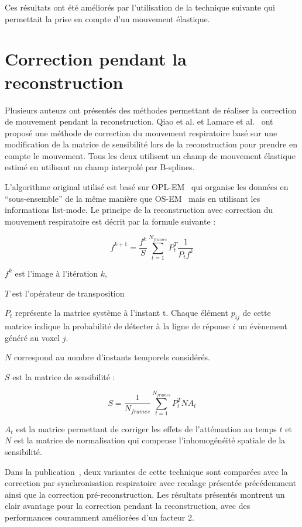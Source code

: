 Ces résultats ont été améliorés par l'utilisation de la technique suivante qui permettait la prise en compte d'un mouvement élastique.

\section{Correction pendant la reconstruction}


Plusieurs auteurs ont présentés des méthodes permettant de réaliser la correction de mouvement pendant la reconstruction. Qiao et al.\cite{qiao2006motion} et Lamare et al.~\cite{lamare2007list} ont proposé une méthode de correction du mouvement respiratoire basé sur une modification de la matrice de sensibilité lors de la reconstruction pour prendre en compte le mouvement. Tous les deux utilisent un champ de mouvement élastique estimé en utilisant un champ interpolé par B-splines.

L'algorithme original utilisé est basé sur OPL-EM~\cite{reader2002one} qui organise les données en ``sous-ensemble'' de la même manière que OS-EM~\cite{hudson1994accelerated} mais en utilisant les informations list-mode. Le principe de la reconstruction avec correction du mouvement respiratoire est décrit par la formule suivante :

\label{lab:corrMatSyst}
\begin{equation}
 f^{k+1}=\frac{f^k}{S} \sum_{t=1}^{N_{frames}} P_t^T \frac{1}{P_t f^k} 
\end{equation}

$f^k$ est l'image à l'itération $k$,

$T$ est l'opérateur de transposition

$P_t$ représente la matrice système à l'instant t. Chaque élément $p_{ij}$ de cette matrice indique la probabilité de détecter à la ligne de réponse $i$ un évènement généré au voxel $j$. 

$N$ correspond au nombre d'instants temporels considérés.

$S$ est la matrice de sensibilité :

\begin{equation}
 S=\frac{1}{N_{frames}} \sum_{t=1}^{N_{frames}} P_t^T N A_t 
\end{equation}

 $A_t$ est la matrice permettant de corriger les effets de l'atténuation au temps $t$ et $N$ est la matrice de normalisation qui compense l'inhomogénéité spatiale de la sensibilité.

Dans la publication~\cite{lamare2007list}, deux variantes de cette technique sont comparées avec la correction par synchronisation respiratoire avec recalage présentée précédemment ainsi que la correction pré-reconstruction. Les résultats présentés montrent un clair avantage pour la correction pendant la reconstruction, avec des performances couramment améliorées d'un facteur 2. 


